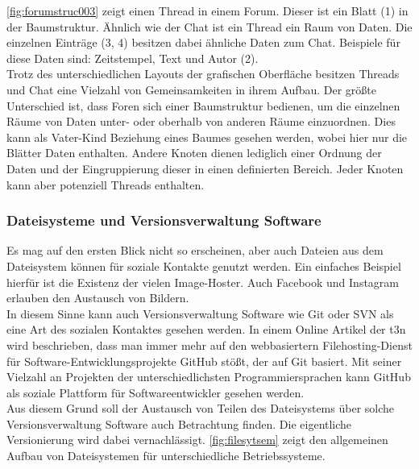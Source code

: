 \documentclass[a4paper]{article}
\begin{document}
	\autoref{fig:forumstruc003} zeigt einen Thread in einem Forum. Dieser ist
	ein Blatt (1) in der Baumstruktur. Ähnlich wie der Chat ist ein Thread ein
	Raum von Daten. Die einzelnen Einträge (3, 4) besitzen dabei  ähnliche Daten
	zum Chat. Beispiele für diese Daten sind: Zeitstempel, Text und Autor (2). \\
	
	Trotz des unterschiedlichen Layouts der grafischen Oberfläche besitzen
	Threads und Chat eine Vielzahl von Gemeinsamkeiten in ihrem Aufbau. Der
	größte Unterschied ist, dass Foren sich einer Baumstruktur bedienen, um
	die einzelnen Räume von Daten unter- oder oberhalb von anderen Räume 
	einzuordnen. Dies kann
	als Vater-Kind Beziehung eines Baumes gesehen werden, wobei hier nur die Blätter
	Daten enthalten. Andere Knoten dienen lediglich einer Ordnung der Daten und 
	der Eingruppierung dieser in einen definierten Bereich. Jeder Knoten kann
	aber potenziell Threads enthalten.
	
	\subsubsection{Dateisysteme und Versionsverwaltung Software}	
	
	Es mag auf den ersten Blick nicht so erscheinen, aber auch Dateien aus
	dem Dateisystem können für soziale Kontakte genutzt werden. Ein einfaches
	Beispiel hierfür ist die Existenz der vielen Image-Hoster. Auch 
	Facebook und Instagram erlauben den Austausch von Bildern. \\
	
	In diesem Sinne kann auch Versionsverwaltung Software wie Git oder SVN als
	eine Art des sozialen Kontaktes gesehen werden. In einem Online Artikel der
	t3n \cite{articleGitHub} wird beschrieben, dass man immer mehr auf den
	webbasiertern Filehosting-Dienst für Software-Entwicklungsprojekte GitHub
	\cite{gitHub} stößt, der auf Git basiert. Mit seiner Vielzahl an Projekten
	der unterschiedlichsten Programmiersprachen kann GitHub als soziale Plattform
	für Softwareentwickler gesehen werden. \\
	
	Aus diesem Grund soll der Austausch von Teilen des Dateisystems über solche 
	Versionsverwaltung Software auch Betrachtung finden. Die eigentliche
	Versionierung wird dabei vernachlässigt. \autoref{fig:filesytsem}
	zeigt den allgemeinen Aufbau von Dateisystemen für unterschiedliche
	Betriebssysteme.
	
\end{document}
